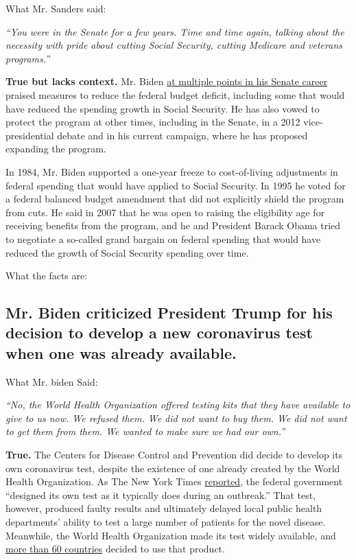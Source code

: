 What Mr. Sanders said:

\emph{``You were in the Senate for a few years. Time and time again,
talking about the necessity with pride about cutting Social Security,
cutting Medicare and veterans programs.''}

\textbf{True but lacks context.} Mr. Biden
\href{https://www.nytimes3xbfgragh.onion/2020/01/26/us/politics/biden-factcheck.html}{at
multiple points in his Senate career} praised measures to reduce the
federal budget deficit, including some that would have reduced the
spending growth in Social Security. He has also vowed to protect the
program at other times, including in the Senate, in a 2012
vice-presidential debate and in his current campaign, where he has
proposed expanding the program.

In 1984, Mr. Biden supported a one-year freeze to cost-of-living
adjustments in federal spending that would have applied to Social
Security. In 1995 he voted for a federal balanced budget amendment that
did not explicitly shield the program from cuts. He said in 2007 that he
was open to raising the eligibility age for receiving benefits from the
program, and he and President Barack Obama tried to negotiate a
so-called grand bargain on federal spending that would have reduced the
growth of Social Security spending over time.

What the facts are:

\hypertarget{mr-biden-criticized-president-trump-for-his-decision-to-develop-a-new-coronavirus-test-when-one-was-already-available}{%
\subsection{Mr. Biden criticized President Trump for his decision to
develop a new coronavirus test when one was already
available.}\label{mr-biden-criticized-president-trump-for-his-decision-to-develop-a-new-coronavirus-test-when-one-was-already-available}}

What Mr. biden Said:

\emph{``No, the World Health Organization offered testing kits that they
have available to give to us now. We refused them. We did not want to
buy them. We did not want to get them from them. We wanted to make sure
we had our own.''}

\textbf{True.} The Centers for Disease Control and Prevention did decide
to develop its own coronavirus test, despite the existence of one
already created by the World Health Organization. As The New York Times
\href{https://www.nytimes3xbfgragh.onion/2020/03/10/us/coronavirus-testing-delays.html}{reported},
the federal government ``designed its own test as it typically does
during an outbreak.'' That test, however, produced faulty results and
ultimately delayed local public health departments' ability to test a
large number of patients for the novel disease. Meanwhile, the World
Health Organization made its test widely available, and
\href{https://www.politico.com/news/2020/03/06/coronavirus-testing-failure-123166}{more
than 60 countries} decided to use that product.

